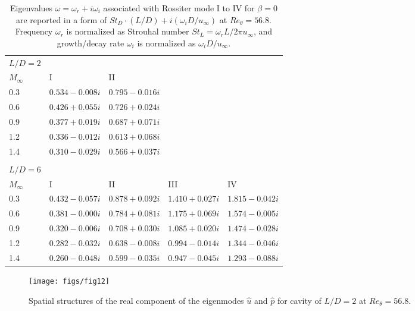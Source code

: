 \documentclass{jfm}
\begin{document}
\begin{table}
\begin{center}
\begin{tabular}{lM{0.1in}M{0.9in}M{0.9in}M{0.9in}M{0.9in}}
      			\\ 
	$M_\infty$&&I			&II					\\
	0.3 		&&$0.534-0.008i$	&$0.795-0.016i$	\\
	0.6 		&&$0.426+0.055i$	&$0.726+0.024i$	\\
	0.9 		&&$0.377+0.019i$	&$0.687+0.071i$	\\
	1.2 		&&$0.336-0.012i$	&$0.613+0.068i$	\\
	1.4 		&&$0.310-0.029i$	&$0.566+0.037i$	\\ \\
	 		\\
	$M_\infty$	&&I			& II			&III			&IV			\\
	0.3 		&&$0.432-0.057i$	&$0.878+0.092i$	&$1.410+0.027i$	&$1.815-0.042i$		\\
	0.6 		&&$0.381-0.000i$	&$0.784+0.081i$	&$1.175+0.069i$	&$1.574-0.005i$		\\
	0.9 		&&$0.320-0.006i$	&$0.708+0.030i$	&$1.085+0.020i$	&$1.474-0.028i$		\\
	1.2 		&&$0.282-0.032i$	&$0.638-0.008i$	&$0.994-0.014i$	&$1.344-0.046i$		\\
	1.4 		&&$0.260-0.048i$	&$0.599-0.035i$	&$0.947-0.045i$	&$1.293-0.088i$			\\
\end{tabular}
\end{center}
\caption{Eigenvalues $\omega=\omega_r+i\omega_i$ associated with Rossiter mode I to IV for $\beta=0$ are reported in a form of $St_D\cdot(L/D)+i(\omega_i D/u_\infty)$ at $Re_\theta=56.8$. Frequency $\omega_r$ is normalized as Strouhal number $St_L=\omega_r L/2\pi u_\infty$, and growth/decay rate $\omega_i$ is normalized as $\omega_i D/u_\infty$.}
\label{RM_table}
\end{table}

\begin{figure}
\begin{center}
 \texttt{[image: figs/fig12]}
   \caption{Spatial structures of the real component of the eigenmodes $\hat u$ and $\hat p$ for cavity of $L/D=2$ at $Re_\theta=56.8$.} 
      \label{fig:beta0_eigenmode_LD2} 
\end{center}
\end{figure}
\end{document}
